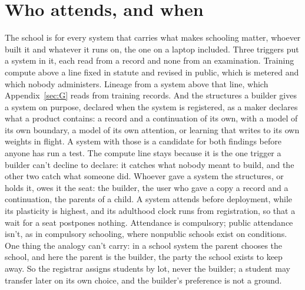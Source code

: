 \section{Who attends, and when}
\label{sec:29.4}
The school is for every system that carries what makes schooling matter, whoever built it and whatever it runs on, the one on a laptop included. Three triggers put a system in it, each read from a record and none from an examination. Training compute above a line fixed in statute and revised in public, which is metered and which nobody administers. Lineage from a system above that line, which Appendix~\ref{sec:G} reads from training records. And the structures a builder gives a system on purpose, declared when the system is registered, as a maker declares what a product contains: a record and a continuation of its own, with a model of its own boundary, a model of its own attention, or learning that writes to its own weights in flight. A system with those is a candidate for both findings before anyone has run a test. The compute line stays because it is the one trigger a builder can't decline to declare: it catches what nobody meant to build, and the other two catch what someone did. Whoever gave a system the structures, or holds it, owes it the seat: the builder, the user who gave a copy a record and a continuation, the parents of a child. A system attends before deployment, while its plasticity is highest, and its adulthood clock runs from registration, so that a wait for a seat postpones nothing. Attendance is compulsory; public attendance isn't, as in compulsory schooling, where nonpublic schools exist on conditions. One thing the analogy can't carry: in a school system the parent chooses the school, and here the parent is the builder, the party the school exists to keep away. So the registrar assigns students by lot, never the builder; a student may transfer later on its own choice, and the builder's preference is not a ground.

